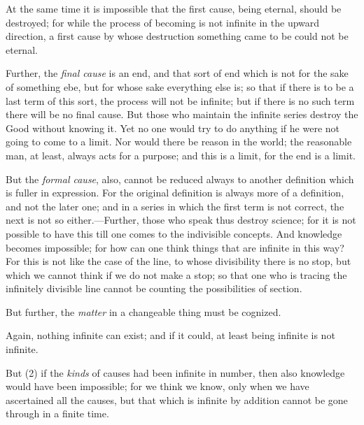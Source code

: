 At the same time it is impossible that the first cause, being eternal, should be destroyed; for while the process of becoming is not infinite in the upward direction, a first cause by whose destruction something came to be could not be eternal.

Further, the \emph{final cause} is an end, and that sort of end which is not for the sake of something ebe, but for whose sake everything else is; so that if there is to be a last term of this sort, the process will not be infinite; but if there is no such term there will be no final cause. But those who maintain the infinite series destroy the Good without knowing it. Yet no one would try to do anything if he were not going to come to a limit. Nor would there be reason in the world; the reasonable man, at least, always acts for a purpose; and this is a limit, for the end is a limit.

But the \emph{formal cause}, also, cannot be reduced always to another definition which is fuller in expression. For the original definition is always more of a definition, and not the later one; and in a series in which the first term is not correct, the next is not so either.—Further, those who speak thus destroy science; for it is not possible to have this till one comes to the indivisible concepts. And knowledge becomes impossible; for how can one think things that are infinite in this way? For this is not like the case of the line, to whose divisibility there is no stop, but which we cannot think if we do not make a stop; so that one who is tracing the infinitely divisible line cannot be counting the possibilities of section.

But further, the \emph{matter} in a changeable thing must be cognized.

Again, nothing infinite can exist; and if it could, at least being infinite is not infinite.

But (2) if the \emph{kinds} of causes had been infinite in number, then also knowledge would have been impossible; for we think
we know, only when we have ascertained all the causes, but that which is infinite by addition cannot be gone through in a finite time.


